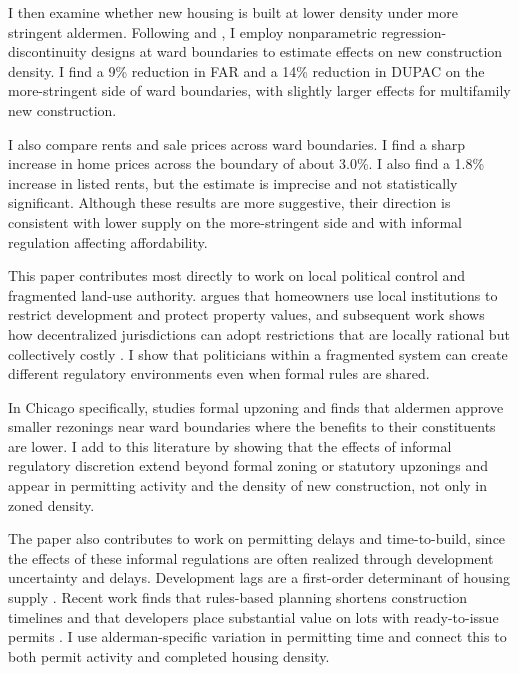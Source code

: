 I then examine whether new housing is built at lower density under more stringent aldermen.
Following \citet{bayer_unified_2007} and \citet{kulka_under_2026}, I employ nonparametric regression-discontinuity designs at ward boundaries to estimate effects on new construction density.
I find a 9\% reduction in FAR and a 14\% reduction in DUPAC on the more-stringent side of ward boundaries, with slightly larger effects for multifamily new construction.

I also compare rents and sale prices across ward boundaries.
I find a sharp increase in home prices across the boundary of about 3.0\%.
I also find a 1.8\% increase in listed rents, but the estimate is imprecise and not statistically significant.
Although these results are more suggestive, their direction is consistent with lower supply on the more-stringent side and with informal regulation affecting affordability.

This paper contributes most directly to work on local political control and fragmented land-use authority.
\citet{fischel_homevoter_2009} argues that homeowners use local institutions to restrict development and protect property values, and subsequent work shows how decentralized jurisdictions can adopt restrictions that are locally rational but collectively costly \citep{hilber_origins_2013, ortalo-magne_political_2014, monarrez_dividing_2023, mast_warding_2024, bordeu_commuting_2025, kulka_under_2026}.
I show that politicians within a fragmented system can create different regulatory environments even when formal rules are shared.

In Chicago specifically, \citet{freemark_upzoning_2020} studies formal upzoning and \citet{khan_decentralized_2021} finds that aldermen approve smaller rezonings near ward boundaries where the benefits to their constituents are lower.
I add to this literature by showing that the effects of informal regulatory discretion extend beyond formal zoning or statutory upzonings and appear in permitting activity and the density of new construction, not only in zoned density.

The paper also contributes to work on permitting delays and time-to-build, since the effects of these informal regulations are often realized through development uncertainty and delays.
Development lags are a first-order determinant of housing supply \citep{mayer_land_2000, mayer_residential_2000, paciorek_supply_2013}.
Recent work finds that rules-based planning shortens construction timelines and that developers place substantial value on lots with ready-to-issue permits \citep{lyons_time_2025, soltas_how_2026}.
I use alderman-specific variation in permitting time and connect this to both permit activity and completed housing density.

